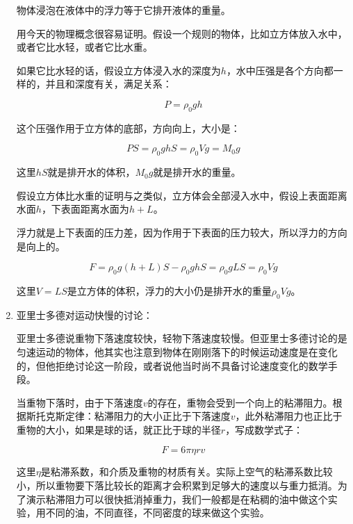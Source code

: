 \begin{enumerate}
物体浸泡在液体中的浮力等于它排开液体的重量。

用今天的物理概念很容易证明。假设一个规则的物体，比如立方体放入水中，或者它比水轻，或者它比水重。

如果它比水轻的话，假设立方体浸入水的深度为$h$，水中压强是各个方向都一样的，并且和深度有关，满足关系：

\begin{equation}
P = \rho_0 g h
\end{equation}

这个压强作用于立方体的底部，方向向上，大小是：

\begin{equation*}
PS = \rho_0 g h S = \rho_0 V g = M_0 g
\end{equation*}

这里$h S$就是排开水的体积，$M_0 g $就是排开水的重量。

假设立方体比水重的证明与之类似，立方体会全部浸入水中，假设上表面距离水面$h$，下表面距离水面为$h + L$。

浮力就是上下表面的压力差，因为作用于下表面的压力较大，所以浮力的方向是向上的。

\begin{equation*}
F = \rho_0 g (h + L) S - \rho_0 g h S = \rho_0 g L S = \rho_0 V g
\end{equation*}

这里$V = LS$是立方体的体积，浮力的大小仍是排开水的重量$\rho_0 V g$。

\item

亚里士多德对运动快慢的讨论：

亚里士多德说重物下落速度较快，轻物下落速度较慢。但亚里士多德讨论的是匀速运动的物体，他其实也注意到物体在刚刚落下的时候运动速度是在变化的，但他拒绝讨论这一阶段，或者说他当时尚不具备讨论速度变化的数学手段。

当重物下落时，由于下落速度$v$的存在，重物会受到一个向上的粘滞阻力。根据斯托克斯定律：粘滞阻力的大小正比于下落速度$v$，此外粘滞阻力也正比于重物的大小，如果是球的话，就正比于球的半径$r$，写成数学式子：

\begin{equation}
F = 6 \pi \eta r v
\end{equation}

这里$\eta$是粘滞系数，和介质及重物的材质有关。实际上空气的粘滞系数比较小，所以重物要下落比较长的距离才会积累到足够大的速度以与重力抵消。为了演示粘滞阻力可以很快抵消掉重力，我们一般都是在粘稠的油中做这个实验，用不同的油，不同直径，不同密度的球来做这个实验。


\end{enumerate}
